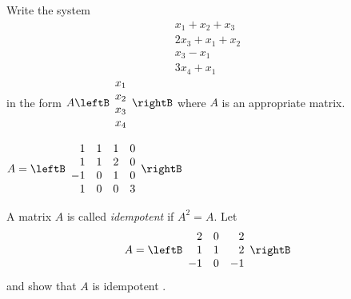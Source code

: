 \begin{enumialphparenastyle}
\begin{ex} Write the system
\begin{equation*}
\begin{array}{c}
x_{1}+x_{2}+x_{3} \\
2x_{3}+x_{1}+x_{2} \\
x_{3}-x_{1} \\
3x_{4}+x_{1}
\end{array}
\end{equation*}
 in the form $A\leftB
\begin{array}{c}
x_{1} \\
x_{2} \\
x_{3} \\
x_{4}
\end{array}
\rightB $ where $A$ is an appropriate matrix. 
\begin{sol}
$A=\leftB
\begin{array}{rrrr}
1 & 1 & 1 & 0 \\
1 & 1 & 2 & 0 \\
-1 & 0 & 1 & 0 \\
1 & 0 & 0 & 3
\end{array}
\rightB$
\end{sol}
\end{ex}


\begin{ex} A matrix $A$ is called {\em idempotent \em}if $A^{2}=A.$ 
Let
\begin{equation*}
A=
\leftB
\begin{array}{rrr}
2 & 0 & 2 \\
1 & 1 & 2 \\
-1 & 0 & -1
\end{array}
\rightB
\end{equation*}
and show that $A$ is idempotent . 
\end{ex}

\end{enumialphparenastyle}